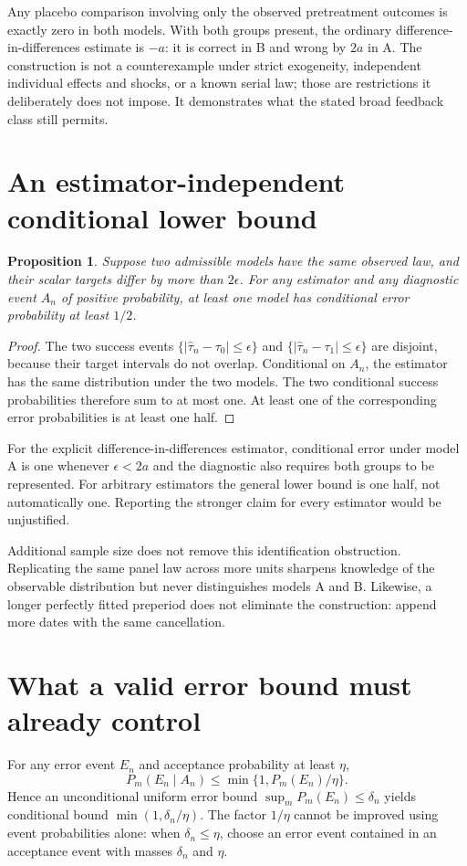 \documentclass[11pt]{article}
\newtheorem{proposition}{Proposition}
\begin{document}
Any placebo comparison involving only the observed pretreatment outcomes is exactly zero in both models. With both groups present, the ordinary difference-in-differences estimate is $-a$: it is correct in B and wrong by $2a$ in A. The construction is not a counterexample under strict exogeneity, independent individual effects and shocks, or a known serial law; those are restrictions it deliberately does not impose. It demonstrates what the stated broad feedback class still permits.

\section*{An estimator-independent conditional lower bound}
\begin{proposition}
Suppose two admissible models have the same observed law, and their scalar targets differ by more than $2\epsilon$. For any estimator and any diagnostic event $A_n$ of positive probability, at least one model has conditional error probability at least $1/2$.
\end{proposition}
\begin{proof}
The two success events $\{|\widehat\tau_n-\tau_0|\leq\epsilon\}$ and $\{|\widehat\tau_n-\tau_1|\leq\epsilon\}$ are disjoint, because their target intervals do not overlap. Conditional on $A_n$, the estimator has the same distribution under the two models. The two conditional success probabilities therefore sum to at most one. At least one of the corresponding error probabilities is at least one half.
\end{proof}

For the explicit difference-in-differences estimator, conditional error under model A is one whenever $\epsilon<2a$ and the diagnostic also requires both groups to be represented. For arbitrary estimators the general lower bound is one half, not automatically one. Reporting the stronger claim for every estimator would be unjustified.

Additional sample size does not remove this identification obstruction. Replicating the same panel law across more units sharpens knowledge of the observable distribution but never distinguishes models A and B. Likewise, a longer perfectly fitted preperiod does not eliminate the construction: append more dates with the same cancellation.

\section*{What a valid error bound must already control}
For any error event $E_n$ and acceptance probability at least $\eta$,
\[
 P_m(E_n\mid A_n)\leq\min\{1,P_m(E_n)/\eta\}.
\]
Hence an unconditional uniform error bound $\sup_mP_m(E_n)\leq\delta_n$ yields conditional bound $\min(1,\delta_n/\eta)$. The factor $1/\eta$ cannot be improved using event probabilities alone: when $\delta_n\leq\eta$, choose an error event contained in an acceptance event with masses $\delta_n$ and $\eta$.
\end{document}
